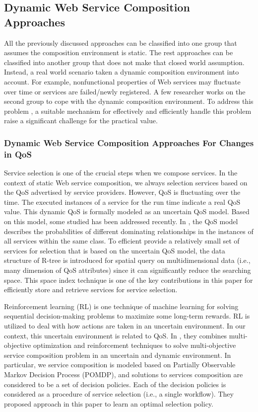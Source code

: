 \subsection{Dynamic Web Service Composition Approaches}\label{dynamicserivce}
All the previously discussed approaches can be classified into one group that assumes the composition environment is static. The rest approaches can be classified into another group that does not make that closed world assumption. Instead, a real world scenario taken a dynamic composition environment into account. For example, nonfunctional properties of Web services may fluctuate over time or services are failed/newly registered. A few researcher works on the second group to cope with the dynamic composition environment. To address this problem \cite{nasridinov2012qos},  a suitable mechanism for effectively and efficiently handle this problem raise a significant challenge for the practical value.

\subsubsection{Dynamic Web Service Composition Approaches For Changes in QoS}\label{dynamicQoS}

Service selection is one of the crucial steps when we compose services. In the context of static Web service composition, we always selection services based on the QoS advertised by service providers. However, QoS is fluctuating over the time. The executed instances of a service for the run time indicate a real QoS value. This dynamic QoS is formally modeled as an uncertain QoS model.  Based on this model, some studied \cite{wen2014probabilistic} has been addressed recently. In \cite{wen2014probabilistic}, the QoS model describes the probabilities of different dominating relationships in the instances of all services within the same class. To efficient provide a relatively small set of services for selection that is based on the uncertain QoS model, the data structure of R-tree is introduced for spatial query on multidimensional data (i.e., many dimension of QoS attributes) since it can significantly reduce the searching space. This space index technique is one of the key contributions in this paper for efficiently store and retrieve services for service selection. 

Reinforcement learning (RL) is one technique of machine learning for solving sequential decision-making problems to maximize some long-term rewards.  RL is utilized to deal with how actions are taken in an uncertain environment. In our context, this uncertain environment is related to QoS. In \cite{mostafa2015multi}, they combines multi-objective optimization and reinforcement techniques to solve multi-objective service composition problem in an uncertain and dynamic environment. In particular, we service composition is modeled based on Partially Observable Markov Decision Process (POMDP), and solutions to services composition are considered to be a set of decision policies. Each of the decision policies is considered as a procedure of service selection (i.e., a single workflow). They proposed approach in this paper to learn an optimal selection policy. 

